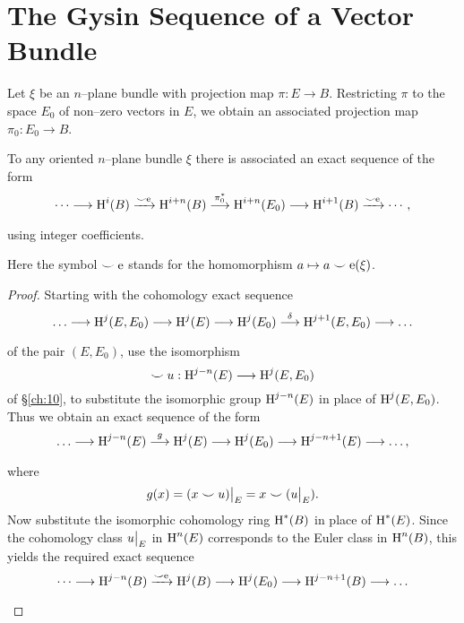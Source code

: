 \documentclass[../main]{subfiles}
\begin{document}
\section{The Gysin Sequence of a Vector Bundle}
Let $\xi$ be an $n$--plane bundle with projection map $\pi : E \longrightarrow B$. Restricting $\pi$ to the space $E_0$ of non--zero vectors in $E$, we obtain an associated projection map $\pi_0 : E_0 \longrightarrow B$. 

\begin{theorem}\label{thm:12.02}
To any oriented $n$--plane bundle $\xi$ there is associated an exact sequence of the form \[\cdots \varrightarrow{} \homology^i(B) \varrightarrow{\smile \eulerclass} \homology^{i + n}(B) \varrightarrow{\pi_0^\ast} \homology^{i + n}(E_0) \varrightarrow{} \homology^{i + 1}(B) \varrightarrow{\smile \eulerclass} \cdots,\] using integer coefficients.
\end{theorem}

Here the symbol $\smile \operatorname{e}$ stands for the homomorphism $a \mapsto a \smile \operatorname{e}(\xi)$. 

\begin{proof}
Starting with the cohomology exact sequence \[\ldots \varrightarrow{} \homology^j(E, E_0) \varrightarrow{} \homology^j(E) \varrightarrow{} \homology^j(E_0) \varrightarrow{\delta} \homology^{j + 1}(E, E_0) \varrightarrow{} \ldots\] of the pair $(E, E_0)$, use the isomorphism \[\smile u : \operatorname{H}^{j - n}(E) \longrightarrow \operatorname{H}^j(E, E_0)\] of \S\ref{ch:10}, to substitute the isomorphic group $\operatorname{H}^{j - n}(E)$ in place of $\operatorname{H}^j(E, E_0)$. Thus we obtain an exact sequence of the form \[\ldots \varrightarrow{} \homology^{j - n}(E) \varrightarrow{g} \homology^j(E) \varrightarrow{} \homology^j(E_0) \varrightarrow{} \homology^{j - n + 1}(E) \varrightarrow{} \ldots,\] where \[g(x) = (x \smile u) \big{|}_E = x \smile (u \big{|}_E).\] Now substitute the isomorphic cohomology ring $\operatorname{H}^\ast(B)$ in place of $\operatorname{H}^\ast(E)$. Since the cohomology class $u \big{|}_E$ in $\operatorname{H}^n(E)$ corresponds to the Euler class in $\operatorname{H}^n(B)$, this yields the required exact sequence \[\cdots \varrightarrow{} \homology^{j - n}(B) \varrightarrow{\smile \eulerclass} \homology^j(B) \varrightarrow{} \homology^j(E_0) \varrightarrow{} \homology^{j - n + 1}(B) \varrightarrow{} \ldots\] 
\end{proof}
\end{document}

